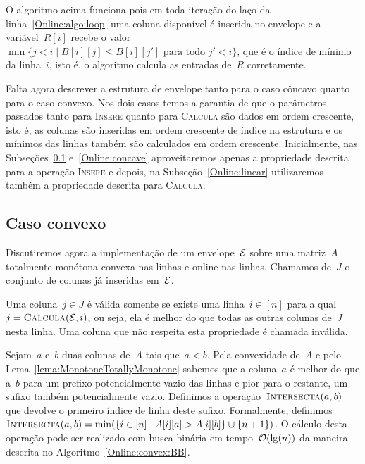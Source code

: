O algoritmo acima funciona pois em toda iteração do laço da linha~\ref{Online:algo:loop} uma coluna disponível é inserida no envelope e a variável~$R[i]$ recebe o valor~$\min\{ j < i \mid B[i][j] \leq B[i][j'] \text{ para todo } j' < i\}$, que é o índice de mínimo da linha~$i$, isto é, o algoritmo calcula as entradas de~$R$ corretamente.

Falta agora descrever a estrutura de envelope tanto para o caso côncavo quanto para o caso convexo. Nos dois casos temos a garantia de que o parâmetros passados tanto para \textsc{Insere} quanto para \textsc{Calcula} são dados em ordem crescente, isto é, as colunas são inseridas em ordem crescente de índice na estrutura e os mínimos das linhas também são calculados em ordem crescente. Inicialmente, nas Subseções~\ref{Online:convex} e~\ref{Online:concave} aproveitaremos apenas a propriedade descrita para a operação \textsc{Insere} e depois, na Subseção~\ref{Online:linear} utilizaremos também a propriedade descrita para \textsc{Calcula}.


\subsection{Caso convexo} \label{Online:convex}
Discutiremos agora a implementação de um envelope~$\mathcal{E}$ sobre uma matriz~$A$ totalmente monótona convexa nas linhas e online nas linhas. Chamamos de~$J$ o conjunto de colunas já inseridas em~$\mathcal{E}$.

\begin{defi}
Uma coluna~$j \in J$ é válida somente se existe uma linha~$i \in [n]$ para a qual~${j = \textsc{Calcula}(\mathcal{E},i)}$, ou seja, ela é melhor do que todas as outras colunas de~$J$ nesta linha. Uma coluna que não respeita esta propriedade é chamada inválida.
\end{defi}

Sejam~$a$ e~$b$ duas colunas de~$A$ tais que~$a < b$. Pela convexidade de~$A$ e pelo Lema~\ref{lema:MonotoneTotallyMonotone} sabemos que a coluna~$a$ é melhor do que a~$b$ para um prefixo potencialmente vazio das linhas e pior para o restante, um sufixo também potencialmente vazio. Definimos a operação~$\textsc{Intersecta}(a,b)$ que devolve o primeiro índice de linha deste sufixo. Formalmente, definimos~${\textsc{Intersecta}(a,b) = \min(\{ i \in [n] \mid A[i][a] > A[i][b] \} \cup \{n+1\})}$. O cálculo desta operação pode ser realizado com busca binária em tempo~$\mathcal{O}(\lg(n))$ da maneira descrita no Algoritmo~\ref{Online:convex:BB}.

